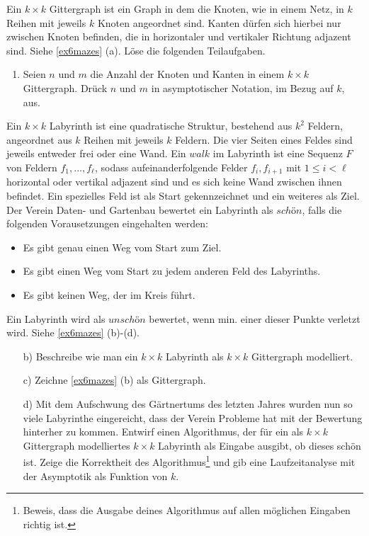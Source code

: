 \documentclass{uebung_cs}
\begin{document}
\begin{aufgabe}
	Ein $k\times k$ Gittergraph ist ein Graph in dem die Knoten, wie in einem Netz, in $k$ Reihen mit jeweils $k$ Knoten angeordnet sind.
	Kanten dürfen sich hierbei nur zwischen Knoten befinden, die in horizontaler und vertikaler Richtung adjazent sind.
	Siehe \ref{ex6mazes} (a).
	Löse die folgenden Teilaufgaben.
	\begin{enumerate}
		\item Seien $n$ und $m$ die Anzahl der Knoten und Kanten in einem $k\times k$ Gittergraph.
		Drück $n$ und $m$ in asymptotischer Notation, im Bezug auf $k$, aus.
	\end{enumerate}
	Ein $k\times k$ Labyrinth ist eine quadratische Struktur, bestehend aus $k^2$ Feldern, angeordnet aus $k$ Reihen mit jeweils $k$ Feldern.
	Die vier Seiten eines Feldes sind jeweils entweder frei oder eine Wand.
	Ein $walk$ im Labyrinth ist eine Sequenz $F$ von Feldern $f_1,..., f_\ell$, sodass aufeinanderfolgende Felder $f_i, f_{i+1}$ mit $1 \leq i < \ell$ horizontal oder vertikal adjazent sind und es sich keine Wand zwischen ihnen befindet.
	Ein spezielles Feld ist als Start gekennzeichnet und ein weiteres als Ziel.
	Der Verein \glqq Daten- und Gartenbau\grqq{} bewertet ein Labyrinth als $schön$, falls die folgenden Vorausetzungen eingehalten werden:
	\begin{itemize}
		\item Es gibt genau einen Weg vom Start zum Ziel.
		\item Es gibt einen Weg vom Start zu jedem anderen Feld des Labyrinths.
		\item Es gibt keinen Weg, der im Kreis führt.
	\end{itemize}
	Ein Labyrinth wird als $unschön$ bewertet, wenn min. einer dieser Punkte verletzt wird.
	Siehe \ref{ex6mazes} (b)-(d).
	\begin{enumerate}
		\item[b)] Beschreibe wie man ein $k\times k$ Labyrinth als $k\times k$ Gittergraph modelliert.
		\item[c)] Zeichne \ref{ex6mazes} (b) als Gittergraph.
		\item[d)] Mit dem Aufschwung des Gärtnertums des letzten Jahres wurden nun so viele Labyrinthe eingereicht, dass der Verein Probleme hat mit der Bewertung hinterher zu kommen.
		Entwirf einen Algorithmus, der für ein als $k\times k$ Gittergraph modelliertes $k\times k$ Labyrinth als Eingabe ausgibt, ob dieses schön ist.
		Zeige die Korrektheit des Algorithmus\footnote{Beweis, dass die Ausgabe deines Algorithmus auf allen möglichen Eingaben richtig ist.} und gib eine Laufzeitanalyse mit der Asymptotik als Funktion von $k$.
	\end{enumerate}
\end{aufgabe}
\end{document}
